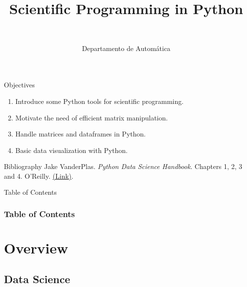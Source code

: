 \documentclass[10pt,compress]{beamer} %
\title[Scientific Programming]{Scientific Programming in Python}
\author{\asignatura\\\carrera}
\institute{}
\date{Departamento de Automática}
\begin{document}
{\titlepageBlue
    \begin{frame}
        \titlepage
    \end{frame}
}

\institute{\asignatura}

\begin{frame}[plain]{}
	\begin{block}{Objectives}
		\begin{enumerate}
		\item Introduce some Python tools for scientific programming.
		\item Motivate the need of efficient matrix manipulation.
		\item Handle matrices and dataframes in Python.
		\item Basic data visualization with Python.
		\end{enumerate}
	\end{block}

   \begin{block}{Bibliography}
       Jake VanderPlas. \textit{Python Data Science Handbook}. Chapters 1, 2, 3 and 4. O'Reilly. \href{https://jakevdp.github.io/PythonDataScienceHandbook/}{(Link)}.
   \end{block}

\end{frame}

{
\begin{frame}[shrink]{Table of Contents}
 \frametitle{Table of Contents}
 \begin{multicols}{2}
 \tableofcontents
 \end{multicols}
\end{frame}
}

\section{Overview}

\subsection{Data Science}
\end{document}
